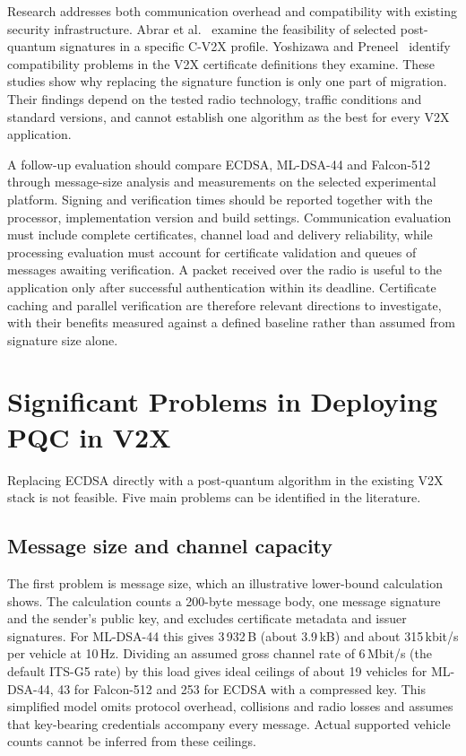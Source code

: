 \documentclass[11pt,a4paper]{article}
\begin{document}
Research addresses both communication overhead and compatibility with existing security
infrastructure. Abrar et al.~\cite{abrar} examine the feasibility of selected post-quantum
signatures in a specific C-V2X profile. Yoshizawa and Preneel~\cite{yoshizawa23} identify
compatibility problems in the V2X certificate definitions they examine. These studies show why
replacing the signature function is only one part of migration. Their findings depend on the
tested radio technology, traffic conditions and standard versions, and cannot establish one
algorithm as the best for every V2X application.

A follow-up evaluation should compare ECDSA, ML-DSA-44 and Falcon-512 through message-size
analysis and measurements on the selected experimental platform. Signing and verification times
should be reported together with the processor, implementation version and build settings.
Communication evaluation must include complete certificates, channel load and delivery
reliability, while processing evaluation must account for certificate validation and queues of
messages awaiting verification. A packet received over the radio is useful to the application
only after successful authentication within its deadline. Certificate caching and parallel
verification are therefore relevant directions to investigate, with their benefits measured
against a defined baseline rather than assumed from signature size alone.

\section{Significant Problems in Deploying PQC in V2X}
\label{sec:problems}

Replacing ECDSA directly with a post-quantum algorithm in the existing V2X stack is not
feasible. Five main problems can be identified in the literature.

\subsection{Message size and channel capacity}

The first problem is message size, which an illustrative lower-bound calculation shows. The
calculation counts a 200-byte message body, one message signature and the sender's public key,
and excludes certificate metadata and issuer signatures. For ML-DSA-44 this gives
3\,932\,B (about 3.9\,kB) and about 315\,kbit/s per vehicle at 10\,Hz. Dividing an assumed gross
channel rate of 6\,Mbit/s (the default ITS-G5 rate) by this load gives ideal ceilings of about
19 vehicles for ML-DSA-44, 43 for Falcon-512 and 253 for ECDSA with a compressed key. This
simplified model omits protocol overhead, collisions and radio losses and assumes that
key-bearing credentials accompany every message. Actual supported vehicle counts cannot be
inferred from these ceilings.
\end{document}
